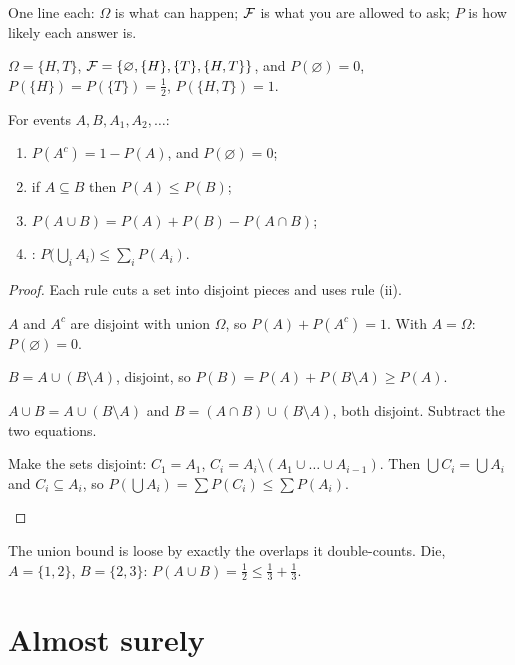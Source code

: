 \begin{intuition}
One line each: $\Omega$ is what can happen; $\mathcal F$ is what you are allowed to ask; $P$ is how likely each answer is.
\end{intuition}

\begin{example}
$\Omega=\{H,T\}$, $\mathcal F=\{\varnothing,\{H\},\{T\},\{H,T\}\}$, and $P(\varnothing)=0$, $P(\{H\})=P(\{T\})=\frac12$, $P(\{H,T\})=1$.
\end{example}

\begin{result}
\label{res:rules}
For events $A,B,A_1,A_2,\ldots$:
\begin{enumerate}[label=(\alph*)]
  \item $P(A^c)=1-P(A)$, and $P(\varnothing)=0$;
  \item if $A\subseteq B$ then $P(A)\le P(B)$;
  \item $P(A\cup B)=P(A)+P(B)-P(A\cap B)$;
  \item {}: $P\big(\bigcup_i A_i\big)\le\sum_i P(A_i)$.
\end{enumerate}
\end{result}
\begin{proof}
Each rule cuts a set into disjoint pieces and uses rule (ii).
\begin{steps}
  \item $A$ and $A^c$ are disjoint with union $\Omega$, so $P(A)+P(A^c)=1$. With $A=\Omega$: $P(\varnothing)=0$.
  \item $B=A\cup(B\setminus A)$, disjoint, so $P(B)=P(A)+P(B\setminus A)\ge P(A)$.
  \item $A\cup B=A\cup(B\setminus A)$ and $B=(A\cap B)\cup(B\setminus A)$, both disjoint. Subtract the two equations.
  \item Make the sets disjoint: $C_1=A_1$, $C_i=A_i\setminus(A_1\cup\dots\cup A_{i-1})$. Then $\bigcup C_i=\bigcup A_i$ and $C_i\subseteq A_i$, so $P(\bigcup A_i)=\sum P(C_i)\le\sum P(A_i)$. \qedhere
\end{steps}
\end{proof}

The union bound is loose by exactly the overlaps it double-counts. Die, $A=\{1,2\}$, $B=\{2,3\}$: $P(A\cup B)=\frac12\le\frac13+\frac13$.

\section{Almost surely}

